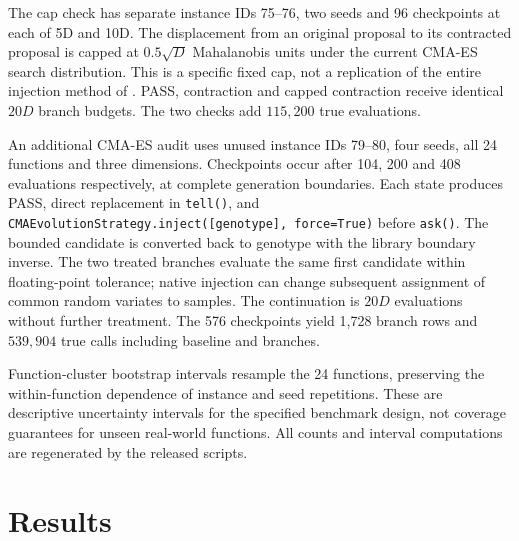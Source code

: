 \documentclass[11pt,a4paper]{article}
\begin{document}
The cap check has separate instance IDs 75--76, two seeds and 96 checkpoints at each of 5D and 10D. The displacement from an original proposal to its contracted proposal is capped at $0.5\sqrt D$ Mahalanobis units under the current CMA-ES search distribution. This is a specific fixed cap, not a replication of the entire injection method of \cite{hansen2011inject}. PASS, contraction and capped contraction receive identical $20D$ branch budgets. The two checks add $115{,}200$ true evaluations.

An additional CMA-ES audit uses unused instance IDs 79--80, four seeds, all 24 functions and three dimensions. Checkpoints occur after 104, 200 and 408 evaluations respectively, at complete generation boundaries. Each state produces PASS, direct replacement in \texttt{tell()}, and \texttt{CMAEvolutionStrategy.inject([genotype], force=True)} before \texttt{ask()}. The bounded candidate is converted back to genotype with the library boundary inverse. The two treated branches evaluate the same first candidate within floating-point tolerance; native injection can change subsequent assignment of common random variates to samples. The continuation is $20D$ evaluations without further treatment. The 576 checkpoints yield 1,728 branch rows and $539{,}904$ true calls including baseline and branches.

Function-cluster bootstrap intervals resample the 24 functions, preserving the within-function dependence of instance and seed repetitions. These are descriptive uncertainty intervals for the specified benchmark design, not coverage guarantees for unseen real-world functions. All counts and interval computations are regenerated by the released scripts.

\section{Results}
\end{document}
